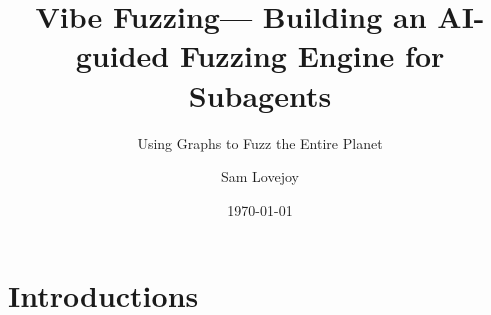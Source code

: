 \documentclass[aspectratio=169]{beamer}
\title{Vibe Fuzzing--- Building an AI-guided Fuzzing Engine for Subagents}
\subtitle{Using Graphs to Fuzz the Entire Planet}
\author[IBM XOR]{Sam Lovejoy}
\date{\today}
\begin{document}
    \section{Introductions}
    \begin{frame}
        \titlepage
    \end{frame}
    
    
    
    
    
\end{document}
